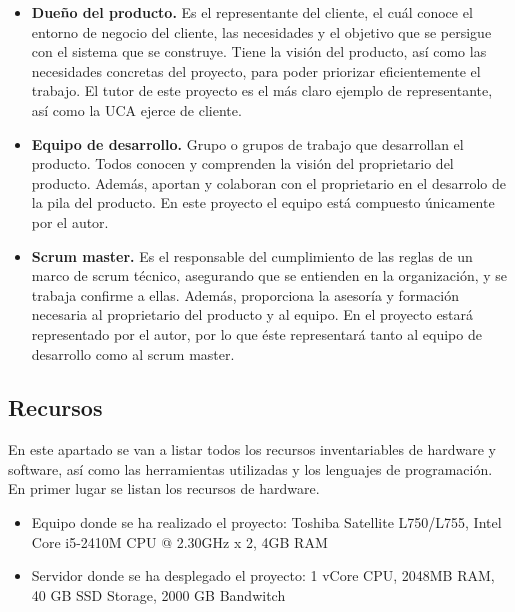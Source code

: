 \begin{itemize}
	\item \textbf{Dueño del producto.} Es el representante del cliente, el cuál conoce el entorno de negocio del cliente, las necesidades y el objetivo que se persigue con el sistema que se construye. Tiene la visión del producto, así como las necesidades concretas del proyecto, para poder priorizar eficientemente el trabajo. El tutor de este proyecto es el más claro ejemplo de representante, así como la UCA ejerce de cliente.
	\item \textbf{Equipo de desarrollo.} Grupo o grupos de trabajo que desarrollan el producto. Todos conocen y comprenden la visión del proprietario del producto. Además, aportan y colaboran con el proprietario en el desarrolo de la pila del producto. En este proyecto el equipo está compuesto únicamente por el autor.
	\item \textbf{Scrum master.} Es el responsable del cumplimiento de las reglas de un marco de scrum técnico, asegurando que se entienden en la organización, y se trabaja confirme a ellas. Además, proporciona la asesoría y formación necesaria al proprietario del producto y al equipo. En el proyecto estará representado por el autor, por lo que éste representará tanto al equipo de desarrollo como al scrum master.
\end{itemize}

\subsection{Recursos}
En este apartado se van a listar todos los recursos inventariables de hardware y software, así como las herramientas utilizadas y los lenguajes de programación.\\

En primer lugar se listan los recursos de hardware.\\

\begin{itemize}
	\item Equipo donde se ha realizado el proyecto: Toshiba Satellite L750/L755, Intel  \textregistered Core \texttrademark  i5-2410M CPU @ 2.30GHz x 2, 4GB RAM
	\item Servidor donde se ha desplegado el proyecto: 1 vCore CPU, 2048MB RAM, 40 GB SSD Storage, 2000 GB Bandwitch
\end{itemize}

